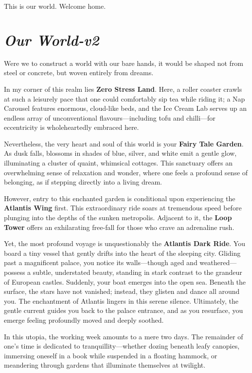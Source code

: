 \vspace{0.5cm}

This is our world. Welcome home.

\newpage

\section*{\textit{Our World-v2}}


Were we to construct a world with our bare hands, it would be shaped not from steel or concrete, but woven entirely from dreams.

In my corner of this realm lies \textbf{Zero Stress Land}. Here, a roller coaster crawls at such a leisurely pace that one could comfortably sip tea while riding it; a Nap Carousel features enormous, cloud-like beds, and the Ice Cream Lab serves up an endless array of unconventional flavours—including tofu and chilli—for eccentricity is wholeheartedly embraced here.

Nevertheless, the very heart and soul of this world is your \textbf{Fairy Tale Garden}. As dusk falls, blossoms in shades of blue, silver, and white emit a gentle glow, illuminating a cluster of quaint, whimsical cottages. This sanctuary offers an overwhelming sense of relaxation and wonder, where one feels a profound sense of belonging, as if stepping directly into a living dream.

However, entry to this enchanted garden is conditional upon experiencing the \textbf{Atlantis Wing} first. This extraordinary ride soars at tremendous speed before plunging into the depths of the sunken metropolis. Adjacent to it, the \textbf{Loop Tower} offers an exhilarating free-fall for those who crave an adrenaline rush.

Yet, the most profound voyage is unquestionably the \textbf{Atlantis Dark Ride}. You board a tiny vessel that gently drifts into the heart of the sleeping city. Gliding past a magnificent palace, you notice its walls—though aged and weathered—possess a subtle, understated beauty, standing in stark contrast to the grandeur of European castles. Suddenly, your boat emerges into the open sea. Beneath the surface, the stars have not vanished; instead, they glisten and dance all around you. The enchantment of Atlantis lingers in this serene silence. Ultimately, the gentle current guides you back to the palace entrance, and as you resurface, you emerge feeling profoundly moved and deeply soothed.

In this utopia, the working week amounts to a mere two days. The remainder of one's time is dedicated to tranquillity—whether dozing beneath leafy canopies, immersing oneself in a book while suspended in a floating hammock, or meandering through gardens that illuminate themselves at twilight.

